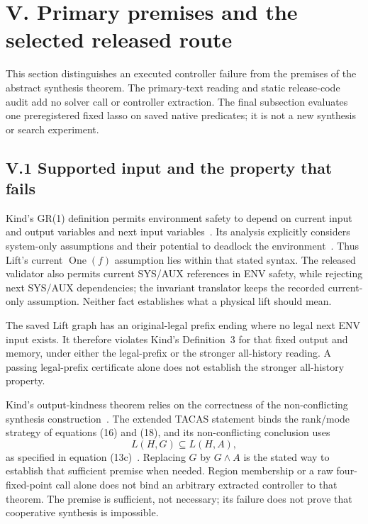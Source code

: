 \section*{V. Primary premises and the selected released route}
\label{supp:v65-scope}
This section distinguishes an executed controller failure from the
premises of the abstract synthesis theorem. The primary-text reading
and static release-code audit add no solver call or controller extraction.
The final subsection evaluates one preregistered fixed lasso on saved
native predicates; it is not a new synthesis or search experiment.

\subsection*{V.1 Supported input and the property that fails}
Kind's GR(1) definition permits environment safety to depend on current
input and output variables and next input variables~\cite[Sec.~3.1]{kind}.
Its analysis explicitly considers system-only assumptions and their
potential to deadlock the environment~\cite[Sec.~5.1 and Appendix~A]{kind}.
Thus Lift's current $\operatorname{One}(f)$ assumption lies within that
stated syntax. The released validator also permits current SYS/AUX
references in ENV safety, while rejecting next SYS/AUX dependencies;
the invariant translator keeps the recorded current-only assumption.
Neither fact establishes what a physical lift should mean.

The saved Lift graph has an original-legal prefix ending where no legal
next ENV input exists. It therefore violates Kind's Definition~3 for
that fixed output and memory, under either the legal-prefix or the
stronger all-history reading. A passing legal-prefix certificate alone
does not establish the stronger all-history property.

Kind's output-kindness theorem relies on the correctness of the
non-conflicting synthesis construction~\cite[Theorem~3 and Appendix~A]{kind}.
The extended TACAS statement binds the rank/mode strategy of equations
(16) and (18), and its non-conflicting conclusion uses
\[
 L(H,G)\subseteq L(H,A),
\]
as specified in equation (13c)~\cite[Theorem~3]{friendly}.
Replacing $G$ by $G\land A$ is the stated way to establish that sufficient
premise when needed. Region membership or a raw four-fixed-point call
alone does not bind an arbitrary extracted controller to that theorem.
The premise is sufficient, not necessary; its failure does not prove
that cooperative synthesis is impossible.

